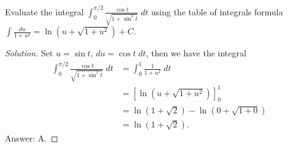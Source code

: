 \begin{problem}
Evaluate the integral $\displaystyle\int_0^{\pi/2}\frac{\cos
  t}{\sqrt{1+\sin^2 t}}\;dt$ using the table of integrals formula
$\displaystyle\int \frac{du}{1+u^2}=\ln\left(u+\sqrt{1+u^2}\right)+C$.
\end{problem}
\begin{proof}[Solution]
Set $u=\sin t$, $du=\cos t\;dt$, then we have the integral
\begin{align*}
\int_0^{\pi/2}\frac{\cos t}{\sqrt{1+\sin^2 t}}\;dt
&=\int_0^1\frac{1}{1+u^2}\;dt\\
&=\left[\ln\left(u+\sqrt{1+u^2}\right)\right]_0^1\\
&=\ln\left(1+\sqrt{2}\right)-\ln \left(0+\sqrt{1+0}\right)\\
&=\boxed{\ln\left( 1+\sqrt{2} \right).}
\end{align*}
Answer: {\color{Red} A.}
\end{proof}

